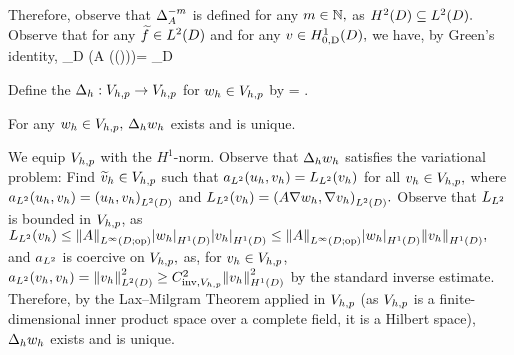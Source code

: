 Therefore, observe that $\Delta_{A}^{-m}$ is defined for any $m \in \mathbb N,$ as $\HtD \subseteq \LtD.$
Observe that for any $\ftilde \in \LtD$ and for any $v \in \HozDD,$ we have, by Green's identity,
\beq\label{eq:deltaagreen}
\int_D \mleft(A \grad \mleft(\DeltaAI(\ftilde)\mright)\mright)\cdot \grad \vb = \int_D \ftilde \vb
\eeq

Define the  $\Delta_{h}:V_{h,p}\rightarrow V_{h,p}$ for $w_{h} \in V_{h,p}$ by
\beq\label{eq:discderdef}
\IPLtD{\Deltah \wh}{\vh} =  \tforall \vh \in \Vhp.
\eeq
\ede

\label{lem:ddwd}
For any $w_{h} \in V_{h,p},$ $\Delta_{h} w_{h}$ exists and is unique.
\ele

We equip $V_{h,p}$ with the $H^1$-norm. Observe that $\Delta_{h} w_{h}$ satisfies the variational problem: Find $\widetilde{v}_{h}  \in V_{h,p}$ such that $a_{L^{2}}(u_{h},v_{h}) = L_{L^{2}}(v_{h})$ for all $v_{h} \in V_{h,p},$ where $\add(\uh,\vh) = \IPLtD{\uh}{\vh}$ and $\Ldd(\vh) = \IPLtD{A \grad \wh}{\grad \vh}.$ Observe that $L_{L^{2}}$ is bounded in $V_{h,p}$, as $\Ldd(\vh) \leq \NLiDop{A} \SNHoD{\wh}\SNHoD{\vh} \leq \NLiDop{A} \SNHoD{\wh}\NHoD{\vh},$ and $a_{L^{2}}$ is coercive on $V_{h,p},$ as, for $v_{h} \in V_{h,p}$, $\add(\vh,\vh) = \NLtD{\vh}^2 \geq \CinvVhp^2 \NHoD{\vh}^2$ by the standard inverse estimate. Therefore, by the Lax--Milgram Theorem applied in $V_{h,p}$ (as $V_{h,p}$ is a finite-dimensional inner product space over a complete field, it is a Hilbert space), $\Delta_{h} w_{h}$ exists and is unique.
\epf


